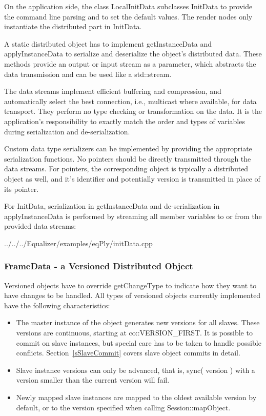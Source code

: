 \documentclass[10pt,a4]{scrartcl}
\newcommand{\sref}[1]{Section~\ref{#1}}
\begin{document}
On the application side, the class \textsf{LocalInitData} subclasses
\textsf{InitData} to provide the command line parsing and to set the
default values. The render nodes only instantiate the distributed part
in \textsf{InitData}.

A static distributed object has to implement \textsf{getInstanceData}
and \textsf{applyInstanceData} to serialize and deserialize the object's
distributed data. These methods provide an output or input stream as a
parameter, which abstracts the data transmission and can be used like a
\textsf{std::stream}.

The data streams implement efficient buffering and compression, and
automatically select the best connection, i.e., multicast where available, for
data transport. They perform no type checking or transformation on the data. It
is the application's responsibility to exactly match the order and types of
variables during serialization and de-serialization.

Custom data type serializers can be implemented by providing the
appropriate serialization functions. No pointers should be directly
transmitted through the data streams. For pointers, the corresponding
object is typically a distributed object as well, and it's identifier
and potentially version is transmitted in place of its pointer.

For \textsf{InitData}, serialization in \textsf{getInstanceData}
and de-serialization in \textsf{applyInstanceData} is performed by
streaming all member variables to or from the provided data
streams:

{\footnotesize
  {../../../Equalizer/examples/eqPly/initData.cpp}}

\subsubsection{FrameData - a Versioned Distributed Object}

Versioned objects have to override \textsf{getChangeType} to indicate
how they want to have changes to be handled. All types of versioned
objects currently implemented have the following characteristics:

\begin{itemize}
\item The master instance of the object generates new versions for all
  slaves. These versions are continuous, starting at
  \textsf{co::VERSION\_FIRST}. It is possible to commit on slave instances, but
  special care has to be taken to handle possible conflicts. \sref{sSlaveCommit}
  covers slave object commits in detail.
\item Slave instance versions can only be advanced, that is, \textsf{sync(
  version )} with a version smaller than the current version will fail.
\item Newly mapped slave instances are mapped to the oldest available
  version by default, or to the version specified when calling
  \textsf{Session::mapObject}.
\end{itemize}
\end{document}
